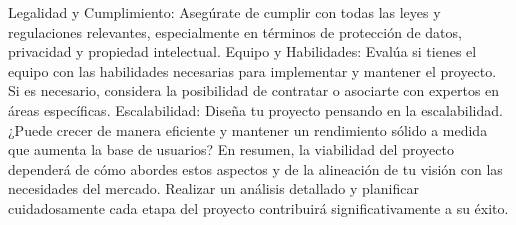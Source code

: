 Legalidad y Cumplimiento:
Asegúrate de cumplir con todas las leyes y regulaciones relevantes, especialmente en términos de protección de datos, privacidad y propiedad intelectual.
Equipo y Habilidades:
Evalúa si tienes el equipo con las habilidades necesarias para implementar y mantener el proyecto. Si es necesario, considera la posibilidad de contratar o asociarte con expertos en áreas específicas.
Escalabilidad:
Diseña tu proyecto pensando en la escalabilidad. ¿Puede crecer de manera eficiente y mantener un rendimiento sólido a medida que aumenta la base de usuarios?
En resumen, la viabilidad del proyecto dependerá de cómo abordes estos aspectos y de la alineación de tu visión con las necesidades del mercado. Realizar un análisis detallado y planificar cuidadosamente cada etapa del proyecto contribuirá significativamente a su éxito.

